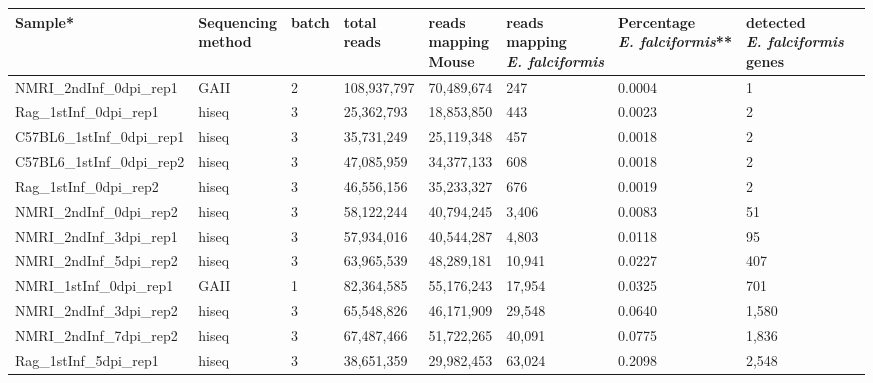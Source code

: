 \documentclass{bmcart}
\begin{document}
\begin{backmatter}

\begin{table}[ht]
\centering
\hspace*{-2.5cm}\begin{tabular}{lllllllll}
  \hline
Sample* & \bcell{Sequencing\\method} & batch & \bcell{total\\reads} & \bcell{reads\\mapping\\Mouse} & \bcell{reads\\mapping\\\textit{E. falciformis}} & \bcell{Percentage\\\textit{E. falciformis}}** & \bcell{detected\\ \textit{E. falciformis}\\genes} \\ 
  \hline
NMRI\_2ndInf\_0dpi\_rep1 & GAII & 2 & 108,937,797 & 70,489,674 & 247 & 0.0004 & 1 \\ 
  Rag\_1stInf\_0dpi\_rep1 & hiseq & 3 & 25,362,793 & 18,853,850 & 443 & 0.0023 & 2 \\ 
  C57BL6\_1stInf\_0dpi\_rep1 & hiseq & 3 & 35,731,249 & 25,119,348 & 457 & 0.0018 & 2 \\ 
  C57BL6\_1stInf\_0dpi\_rep2 & hiseq & 3 & 47,085,959 & 34,377,133 & 608 & 0.0018 & 2 \\ 
  Rag\_1stInf\_0dpi\_rep2 & hiseq & 3 & 46,556,156 & 35,233,327 & 676 & 0.0019 & 2 \\ 
  NMRI\_2ndInf\_0dpi\_rep2 & hiseq & 3 & 58,122,244 & 40,794,245 & 3,406 & 0.0083 & 51 \\ 
  \rowcolor{LightCyan}
  NMRI\_2ndInf\_3dpi\_rep1 & hiseq & 3 & 57,934,016 & 40,544,287 & 4,803 & 0.0118 & 95 \\ 
  \rowcolor{LightCyan}
  NMRI\_2ndInf\_5dpi\_rep2 & hiseq & 3 & 63,965,539 & 48,289,181 & 10,941 & 0.0227 & 407 \\ 
  \rowcolor{LightRed}
  NMRI\_1stInf\_0dpi\_rep1 & GAII & 1 & 82,364,585 & 55,176,243 & 17,954 & 0.0325 & 701 \\ 
  NMRI\_2ndInf\_3dpi\_rep2 & hiseq & 3 & 65,548,826 & 46,171,909 & 29,548 & 0.0640 & 1,580 \\ 
  NMRI\_2ndInf\_7dpi\_rep2 & hiseq & 3 & 67,487,466 & 51,722,265 & 40,091 & 0.0775 & 1,836 \\ 
  Rag\_1stInf\_5dpi\_rep1 & hiseq & 3 & 38,651,359 & 29,982,453 & 63,024 & 0.2098 & 2,548 \\ 

\end{tabular}
\end{table}
\end{backmatter}
\end{document}
